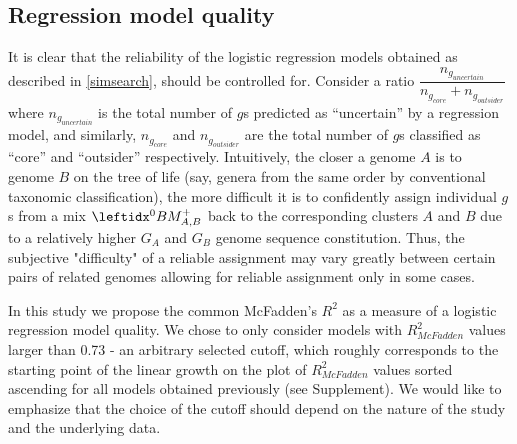 \subsection{Regression model quality}
\label{regmodqual}
It is clear that the reliability of the logistic regression models obtained as
described in \ref{simsearch}, should be controlled for. Consider a ratio
$\dfrac{n_{g_{uncertain}}}{n_{g_{core}}+n_{g_{outsider}}}$ where
$n_{g_{uncertain}}$ is the total number of $g$s predicted as ``uncertain'' by a
regression model, and similarly, $n_{g_{core}}$ and $n_{g_{outsider}}$ are the
total number of $g$s classified as ``core'' and ``outsider'' respectively.
Intuitively, the closer a genome $A$ is to genome $B$ on the tree of life (say,
genera from the same order by conventional taxonomic classification), the more
difficult it is to confidently assign individual $g$s from a mix $\bmzpab$ back
to the corresponding clusters $A$ and $B$ due to a relatively higher
$G_A$ and $G_B$ genome sequence constitution. Thus, the subjective "difficulty"
of a reliable assignment may vary greatly between certain pairs of related
genomes allowing for reliable assignment only in some cases.

In this study we propose the common McFadden's $R^2$ \cite{McFadden1974} as a
measure of a logistic regression model quality. We chose to only consider
models with $R_{McFadden}^2$ values larger than 0.73 - an arbitrary selected
cutoff, which roughly corresponds to the starting point of the linear growth on
the plot of $R_{McFadden}^2$ values sorted ascending for all models obtained
previously (see Supplement). We would like to emphasize that the choice of the
cutoff should depend on the nature of the study and the underlying data.
